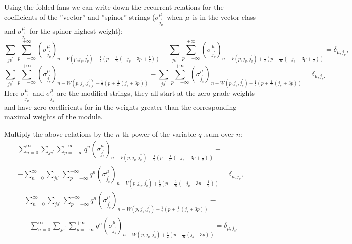 \documentclass{article}
\begin{document}
Using the folded fans we can write down the recurrent relations for the
coefficients of the ''vector'' and ''spinor'' strings ($\sigma
_{j_{v}^{\prime }}^{\mu }$\ when $\mu $\ is in the vector class and $\sigma
_{j_{s}^{\prime }}^{\mu }$\ for the spinor highest weight): 
\begin{equation*}
\sum_{jv^{\prime }}\sum_{p=-\infty }^{+\infty }\left( \sigma _{j_{v}^{\prime
}}^{\mu }\right) _{n-V\left( p,j_{v},j_{v}^{\prime }\right) -\frac{1}{2}%
\left( p-\frac{1}{K}\left( -j_{v}-3p+\frac{1}{2}\right) \right)
}-\sum_{jv^{\prime }}\sum_{p=-\infty }^{+\infty }\left( \sigma
_{j_{v}^{\prime }}^{\mu }\right) _{n-V\left( p,j_{v},j_{v}^{\prime }\right) +%
\frac{1}{2}\left( p-\frac{1}{K}\left( -j_{v}-3p+\frac{1}{2}\right) \right)
}=\delta _{\mu ,j_{v}},
\end{equation*}
\begin{equation*}
\sum_{js^{\prime }}\sum_{p=-\infty }^{+\infty }\left( \sigma _{j_{s}^{\prime
}}^{\mu }\right) _{n-W\left( p,j_{s},j_{s}^{\prime }\right) -\frac{1}{2}%
\left( p+\frac{1}{K}\left( j_{s}+3p\right) \right) }-\sum_{js^{\prime
}}\sum_{p=-\infty }^{+\infty }\left( \sigma _{j_{s}^{\prime }}^{\mu }\right)
_{n-W\left( p,j_{v},j_{s}^{\prime }\right) +\frac{1}{2}\left( p+\frac{1}{K}%
\left( j_{s}+3p\right) \right) }=\delta _{\mu ,j_{s}.}
\end{equation*}
Here $\sigma _{j_{v}^{\prime }}^{\mu }$\ and $\sigma _{j_{s}^{\prime }}^{\mu
}$ are the modified strings, they all start at the zero grade weights and
have zero coefficients for in the weights greater than the corresponding
maximal weights of the module.

Multiply the above relations by the $n$-th power of the variable $q$ ,sum
over $n$: 
\begin{multline*}
\sum_{n=0}^{\infty }\sum_{jv^{\prime }}\sum_{p=-\infty }^{+\infty
}q^{n}\left( \sigma _{j_{v}^{\prime }}^{\mu }\right) _{n-V\left(
p,j_{v},j_{v}^{\prime }\right) -\frac{1}{2}\left( p-\frac{1}{K}\left(
-j_{v}-3p+\frac{1}{2}\right) \right) }- \\
-\sum_{n=0}^{\infty }\sum_{jv^{\prime }}\sum_{p=-\infty }^{+\infty
}q^{n}\left( \sigma _{j_{v}^{\prime }}^{\mu }\right) _{n-V\left(
p,j_{v},j_{v}^{\prime }\right) +\frac{1}{2}\left( p-\frac{1}{K}\left(
-j_{v}-3p+\frac{1}{2}\right) \right) }=\delta _{\mu ,j_{v}},
\end{multline*}
\begin{multline*}
\sum_{n=0}^{\infty }\sum_{js^{\prime }}\sum_{p=-\infty }^{+\infty
}q^{n}\left( \sigma _{j_{s}^{\prime }}^{\mu }\right) _{n-W\left(
p,j_{s},j_{s}^{\prime }\right) -\frac{1}{2}\left( p+\frac{1}{K}\left(
j_{s}+3p\right) \right) }- \\
-\sum_{n=0}^{\infty }\sum_{js^{\prime }}\sum_{p=-\infty }^{+\infty
}q^{n}\left( \sigma _{j_{s}^{\prime }}^{\mu }\right) _{n-W\left(
p,j_{v},j_{s}^{\prime }\right) +\frac{1}{2}\left( p+\frac{1}{K}\left(
j_{s}+3p\right) \right) }=\delta _{\mu ,j_{s}.}
\end{multline*}
\end{document}
